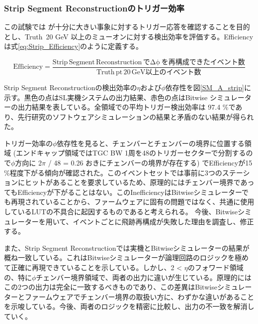 \subsubsection*{Strip Segment Reconstructionのトリガー効率}
この試験では \pt  が十分に大きい事象に対するトリガー応答を確認することを目的とし、Truth \pt $\,$20 GeV 以上のミューオンに対する検出効率を評価する。Efficiencyは式\ref{eq:Strip_Efficiency}のように定義する。

\begin{equation}
    \mathrm {Efficiency} = \frac{\mathrm{Strip\,Segment \,Reconstruction\,で\Delta\phi\,を再構成できたイベント数}}{\mathrm{Truth\,pt \,20 \,GeV以上のイベント数}}
    \label{eq:Strip_Efficiency}
\end{equation}

Strip Segment Reconstructionの検出効率の$\eta$および$\phi$依存性を図\ref{SM_A_strip}に示す。黒色の点はSL実機システムの出力結果、赤色の点はBitwise シミュレーターの出力結果を表している。全領域での平均トリガー検出効率は 97.4 \%であり、先行研究のソフトウェアシミュレーションの結果と矛盾のない結果が得られた。

トリガー効率の$\phi$依存性を見ると、チェンバーとチェンバーの境界に位置する領域 (エンドキャップ領域ではTGC BW 1周を48のトリガーセクターで分割するので$\phi$方向に 2$\pi$ / 48 = 0.26 おきにチェンバーの境界が存在する) でEfficiencyが15 \%程度下がる傾向が確認された。このイベントセットでは事前に3つのステーションにヒットがあることを要求しているため、原理的にはチェンバー境界であってもEfficiencyが下がることはない。このInefficiencyはBitwiseシミュレーターでも再現されていることから、ファームウェアに固有の問題ではなく、共通に使用しているLUTの不具合に起因するものであると考えられる。
今後、Bitwiseシミュレーターを用いて、イベントごとに飛跡再構成が失敗した理由を調査し、修正する。

また、Strip Segment Reconstructionでは実機とBitwiseシミュレーターの結果が概ね一致している。これはBitwiseシミュレーターが論理回路のロジックを極めて正確に再現できていることを示している。しかし、2 < $\eta$のフォワード領域の、特に$\phi$チェンバー境界領域で、両者の出力に違いが生じている。原理的にはこの2つの出力は完全に一致するべきものであり、この差異はBitwiseシミュレーターとファームウェアでチェンバー境界の取扱い方に、わずかな違いがあることを示唆している。今後、両者のロジックを精密に比較し、出力の不一致を解消していく。

